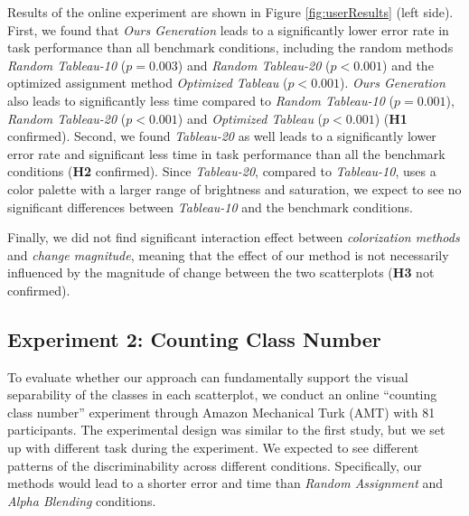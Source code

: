 Results of the online experiment are shown in Figure \ref{fig:userResults} (left side).
First, we found that \emph{Ours Generation} leads to a significantly lower error rate in task performance than all benchmark conditions, including the random methods \emph{Random Tableau-10} (\emph{$p = 0.003$}) and \emph{Random Tableau-20} (\emph{$p < 0.001$}) and the optimized assignment method \emph{Optimized Tableau} (\emph{$p < 0.001$}). \emph{Ours Generation} also leads to significantly less time compared to \emph{Random Tableau-10} (\emph{$p = 0.001$}), \emph{Random Tableau-20} (\emph{$p < 0.001$}) and \emph{Optimized Tableau} (\emph{$p < 0.001$}) (\textbf{H1} confirmed).
Second, we found \emph{Tableau-20} as well leads to a significantly lower error rate and significant less time in task performance than all the benchmark conditions (\textbf{H2} confirmed). Since \emph{Tableau-20}, compared to \emph{Tableau-10}, uses a color palette with a larger range of brightness and saturation, we expect to see no significant differences between \emph{Tableau-10} and the benchmark conditions.

Finally, we did not find significant interaction effect between \emph{colorization methods} and \emph{change magnitude}, meaning that the effect of our method is not necessarily influenced by the magnitude of change between the two scatterplots (\textbf{H3} not confirmed).


\subsection{Experiment 2: Counting Class Number}
\label{subsec:onlinestudy2}
To evaluate whether our approach can fundamentally support the visual separability of the classes in each scatterplot, we conduct an online ``counting class number'' experiment through Amazon Mechanical Turk (AMT) with 81 participants. The experimental design was similar to the first study, but we set up with different task during the experiment.
We expected to see different patterns of the discriminability across different conditions. Specifically, our methods would lead to a shorter error and time than \emph{Random Assignment} and \emph{Alpha Blending} conditions.

